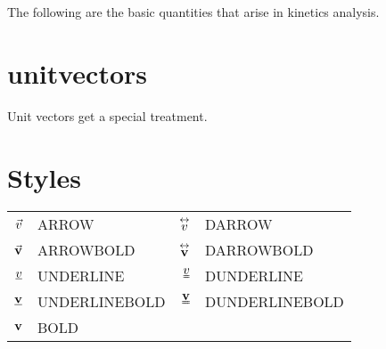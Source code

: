 \documentclass[10pt,a4paper]{article}
\begin{document}
The following are the basic quantities that arise in kinetics analysis.
\begin{SideBySideExample}[xrightmargin=1cm,frame=single]
  \Displacement[end=b,start=a]
  \Velocity[object=a,wrt=0]
  \Acceleration[object=a,wrt=0]
  \AngularVelocity[object=a,wrt=0]
  \AngularAcceleration[object=a,wrt=0]
  \AngularImpulse[object=a,wrt=0,around=c]
  \Impulse[object=a,wrt=0]
  \Force[on=a,from=0,at=c]
  \Torque[on=a,from=0,around=c]
  \InertiaTensor[object=a,around=c]
  \Transformation[frame=a,wrt=b]
\end{SideBySideExample}

\section{unitvectors}

Unit vectors get a special treatment.

\begin{SideBySideExample}[xrightmargin=1cm,frame=single]
  \UnitVector[axis=x,frame=3]
  \UnitVector[axis=y,frame=3]
  \UnitVector[axis=z,frame=3]
\end{SideBySideExample}

\begin{SideBySideExample}[xrightmargin=1cm,frame=single]
  \UnitVector[axis=1,frame=3]
  \UnitVector[axis=2,frame=3]
  \UnitVector[axis=3,frame=3]
\end{SideBySideExample}

\begin{SideBySideExample}[xrightmargin=1cm,frame=single]
  \UnitVector[axis=x,frame=3,expressedIn=2]
  \UnitVector[axis=y,frame=3,diff=2]
\end{SideBySideExample}


\section{Styles}


 \begin{tabular}{ r l rl }
    $\vec{v}$ & ARROW &  $\overset{\leftrightarrow}{v}$ & DARROW \\
    $\vec{\mathbf{v}}$ & ARROWBOLD &  $\overset{\leftrightarrow}{\mathbf{v}}$ & DARROWBOLD \\
    $\UNDERLINE{v}$ & UNDERLINE &  $\DUNDERLINE{v}$ & DUNDERLINE \\
    $\UNDERLINEBOLD{v}$ & UNDERLINEBOLD &  $\DUNDERLINEBOLD{v}$ & DUNDERLINEBOLD \\
    $\mathbf{v}$ & BOLD \\
  \end{tabular}
\end{document}
